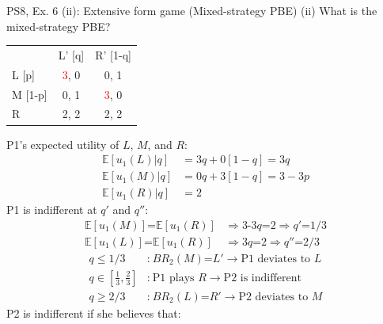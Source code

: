 \begin{frame}{PS8, Ex. 6 (ii): Extensive form game (Mixed-strategy PBE)}
    (ii) What is the mixed-strategy PBE? \vspace{-10pt}
    \begin{multicols}{2}
      \begin{table}
        \begin{tabular}{l|c|c|}
          \multicolumn{1}{c}{} & \multicolumn{1}{c}{L' [q]} & \multicolumn{1}{c}{R' [1-q]} \\\cline{2-3}
          L [p]   & \textcolor{red}{3}, 0 & 0, \color{blue}1 \\\cline{2-3}
          M [1-p] & 0, \color{blue}1 & \textcolor{red}{3}, 0 \\\cline{2-3}
          R       & 2, \color{blue}2 & 2, \color{blue}2 \\\cline{2-3}
        \end{tabular}
      \end{table} \vspace{-6pt}
      P1's expected utility of $L$, $M$, and $R$: \vspace{-8pt}
      \begin{align*}
        \mathbb{E}[u_1(L)|q]&=3q+0[1-q]=3q\\
        \mathbb{E}[u_1(M)|q]&=0q+3[1-q]=3-3p\\
        \mathbb{E}[u_1(R)|q]&=2
      \end{align*}
      P1 is indifferent at $q'$ and $q''$: \vspace{-8pt}
      \begin{align*}
        \mathbb{E}[u_1(M)]\text{=}\mathbb{E}[u_1(R)]&\Rightarrow \text{3-3}q\text{=}2\Rightarrow q'\text{=}1/3\\
        \mathbb{E}[u_1(L)]\text{=}\mathbb{E}[u_1(R)]&\Rightarrow 3q\text{=}2\Rightarrow q''\text{=}2/3
      \end{align*} \vspace{-22pt}
      \begin{align*}
        q\leq1/3&\text{:}\ BR_2(M)\text{=}L'\rightarrow\text{P1 deviates to }L\\
        q\text{$\in$}{\textstyle\left[\frac{1}{3},\frac{2}{3}\right]}&\text{:}\ \text{P1 plays }R\rightarrow\text{P2 is indifferent}\\
        q\geq2/3&\text{:}\ BR_2(L)\text{=}R'\rightarrow\text{P2 deviates to }M
      \end{align*}
      P2 is indifferent if she believes that: \vspace{-8pt}

\end{multicols}
\end{frame}
